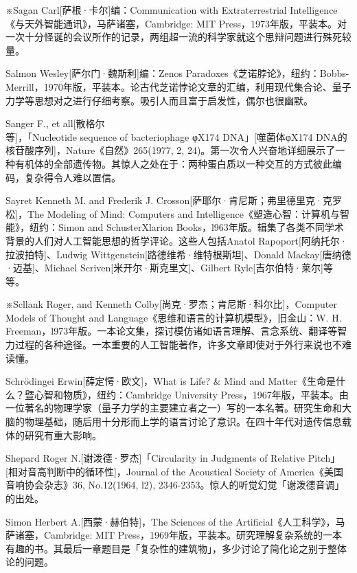 \documentclass[
  12pt,
  twoside,
  openright,
  oldfontcommands,
]{memoir}
\begin{document}
※Sagan Carl{[}萨根·卡尔{]}编：Communication with Extraterrestrial
Intelligence《与天外智能通讯》，马萨诸塞，Cambridge: MIT
Press，1973年版，平装本。对一次十分怪诞的会议所作的记录，两组超一流的科学家就这个思辩问题进行殊死较量。

Salmon Wesley{[}萨尔门·魏斯利{]}编：Zeno\textquotesingle s
Paradoxes《芝诺脖论》，纽约：Bobbs-Merrill，1970年版，平装本。论古代芝诺悖论文章的汇编，利用现代集合论、量子力学等思想对之进行仔细考察。吸引人而且富于启发性，偶尔也很幽默。

Sanger F., et all{[}散格尔等{]}，「Nucleotide sequence of bacteriophage
φX174 DNA」{[}噬菌体φX174 DNA的核苷酸序列{]}，Nature《自然》265(1977, 2,
24)。第一次令人兴奋地详细展示了一种有机体的全部遗传物。其惊人之处在于：两种蛋白质以一种交互的方式彼此编码，复杂得令人难以置信。

Sayret Kenneth M. and Frederik J.
Crosson{[}萨耶尔·肯尼斯；弗里德里克·克罗松{]}，The Modeling of Mind:
Computers and Intelligence《塑造心智：计算机与智能》，纽约：Simon and
SchusterXlarion
Books，l963年版。辑集了各类不同学术背景的人们对人工智能思想的哲学评论。这些人包括Anatol
Rapoport{[}阿纳托尔·拉波拍特{]}、Ludwig
Wittgenstein{[}路德维希·维特根斯坦{]}、Donald
Mackay{[}唐纳德·迈基{]}、Michael Scriven{[}米开尔·斯克里文{]}、Gilbert
Ryle{[}吉尔伯特·莱尔{]}等等。

※Scllank Roger, and Kenneth
Colby{[}尚克·罗杰；肯尼斯·科尔比{]}，Computer Models of Thought and
Language《思维和语言的计算机模型》，旧金山：W. H.
Freeman，l973年版。一本论文集，探讨模仿诸如语言理解、言念系统、翻译等智力过程的各种途径。一本重要的人工智能著作，许多文章即使对于外行来说也不难读懂。

Schrödingei Erwin{[}薛定愕·欧文{]}，What is Life? \& Mind and
Matter《生命是什么？暨心智和物质》，纽约：Cambridge University
Press，1967年版，平装本。由一位著名的物理学家（量子力学的主要建立者之一）写的一本名著。研究生命和大脑的物理基础，随后用十分形而上学的语言讨论了意识。在四十年代对遗传信息载体的研究有重大影响。

Shepard Roger N.{[}谢泼德·罗杰{]}「Circularity in Judgments of Relative
Pitch」{[}相对音高判断中的循环性{]}，Journal of the Acoustical Society
of America《美国音响协会杂志》36, No.12(1964, l2),
2346-2353。惊人的听觉幻觉「谢泼德音调」的出处。

Simon Herbert A.{[}西蒙·赫伯特{]}，The Sciences of the
Artificial《人工科学》，马萨诸塞，Cambridge: MIT
Press，1969年版，平装本。研究理解复杂系统的一本有趣的书。其最后一章题目是「复杂性的建筑物」，多少讨论了简化论之别于整体论的问题。
\end{document}
